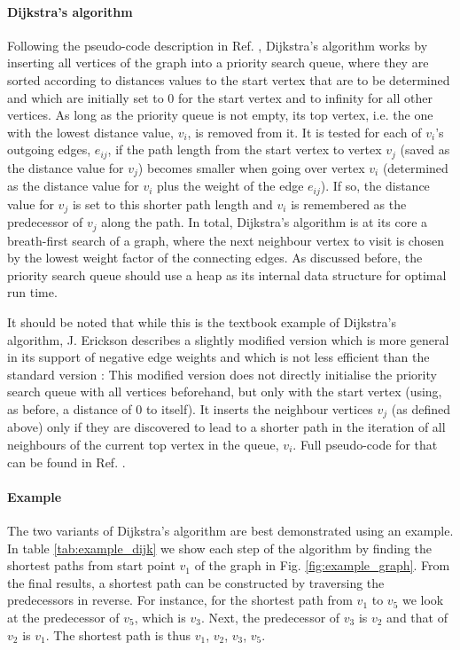 \paragraph{Dijkstra's algorithm}
Following the pseudo-code description in Ref. \cite[p. 17]{FUH_algo_graphs_2021}, Dijkstra's algorithm
works by inserting all vertices of the graph into a priority search queue, where they are sorted according 
to distances values to the start vertex that are to be determined and which are initially set to $0$ for
the start vertex and to infinity for all other vertices.
As long as the priority queue is not empty, its top vertex, i.e. the one with the lowest distance value, 
$v_i$, is removed from it. 
It is tested for each of $v_i$'s outgoing edges, $e_{ij}$, if the path length from the start vertex to 
vertex $v_j$ (saved as the distance value for $v_j$) becomes smaller when going over vertex $v_i$ (determined
as the distance value for $v_i$ plus the weight of the edge $e_{ij}$). 
If so, the distance value for $v_j$ is set to this shorter path length and $v_i$ is remembered as the
predecessor of $v_j$ along the path.
In total, Dijkstra's algorithm is at its core a breath-first search of a graph, where the next neighbour 
vertex to visit is chosen by the lowest weight factor of the connecting edges.
As discussed before, the priority search queue should use a heap as its internal data structure for
optimal run time.

It should be noted that while this is the textbook example of Dijkstra's algorithm, J. Erickson describes
a slightly modified version which is more general in its support of negative edge weights and which is not
less efficient than the standard version \cite[pp. 284-288]{Erickson2019}:
This modified version does not directly initialise the priority search queue with all vertices beforehand, 
but only with the start vertex (using, as before, a distance of $0$ to itself).
It inserts the neighbour vertices $v_j$ (as defined above) only if they are discovered to lead to a shorter 
path in the iteration of all neighbours of the current top vertex in the queue, $v_i$. Full pseudo-code 
for that can be found in Ref. \cite[p. 285]{Erickson2019}.

\paragraph{Example}
The two variants of Dijkstra's algorithm are best demonstrated using an example.
In table \ref{tab:example_dijk} we show each step of the algorithm by finding the shortest
paths from start point $v_1$ of the graph in Fig. \ref{fig:example_graph}.
From the final results, a shortest path can be constructed by traversing the predecessors in
reverse. For instance, for the shortest path from $v_1$ to $v_5$ we look at the predecessor
of $v_5$, which is $v_3$. Next, the predecessor of $v_3$ is $v_2$ and that of $v_2$ is $v_1$.
The shortest path is thus $v_1$, $v_2$, $v_3$, $v_5$.


